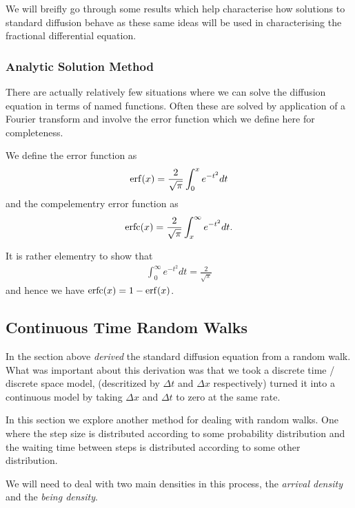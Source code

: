 We will breifly go through some results which help characterise how solutions to standard diffusion behave as these same ideas will be used in characterising the fractional differential equation.

\subsubsection{Analytic Solution Method}

There are actually relatively few situations where we can solve the diffusion equation in terms of named functions. Often these are solved by application of a Fourier transform and involve the error function which we define here for completeness.

\begin{definition}
    We define the error function as
    \begin{align}
        \operatorname{erf}(x) = \frac{2}{\sqrt{\pi}} \int_0^x e^{-t^2} dt
    \end{align}
    and the compelementry error function as
    \begin{align}
        \operatorname{erfc}(x) = \frac{2}{\sqrt{\pi}} \int_x^\infty e^{-t^2} dt.
    \end{align}
\end{definition}
It is rather elementry to show that
\begin{align}
    \int_0^\infty e^{-t^2} dt = \frac{2}{\sqrt{\pi}}
\end{align}
and hence we have $ \operatorname{erfc}(x) = 1 - \operatorname{erf}(x) $.

\subsection{Continuous Time Random Walks}
In the section above \emph{derived} the standard diffusion equation from a random walk. What was important about this derivation was that we took a discrete time / discrete space model, (descritized by $ \Delta t $ and $ \Delta x $ respectively) turned it into a continuous model by taking $ \Delta x $ and $ \Delta t $ to zero at the same rate. 

In this section we explore another method for dealing with random walks. One where the step size is distributed according to some probability distribution and the waiting time between steps is distributed according to some other distribution.

We will need to deal with two main densities in this process, the \emph{arrival density} and the \emph{being density}. 

